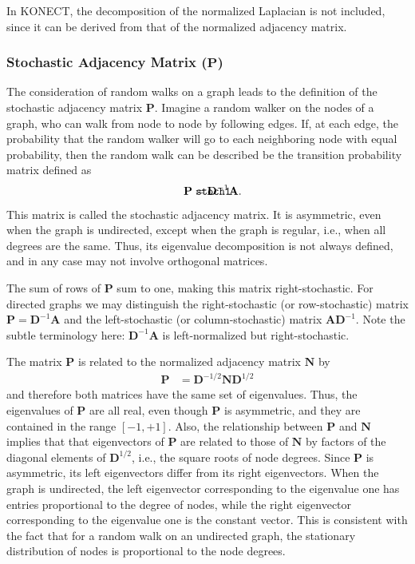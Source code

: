 \documentclass{article}
\def\mathnote#1{%
  \tag*{\rlap{\hspace\marginparsep\smash{\parbox[t]{\marginparwidth}{#1}}}}
}
\begin{document}
In KONECT, the decomposition of the normalized Laplacian is not
included, since it can be derived from that of the normalized adjacency
matrix. 

\subsubsection{Stochastic Adjacency Matrix ($\mathbf P$)}
The consideration of random walks on a graph leads to the definition of
the stochastic adjacency matrix $\mathbf P$.  Imagine a random walker on
the nodes of a graph, who can walk from node to node by following
edges.  If, at each edge, the probability that the random walker will go
to each neighboring node with equal probability, then the random walk
can be described be the transition probability matrix defined as
\begin{align*}
  \mathnote{\texttt{stoch1}}
  \mathbf P &= \mathbf D^{-1} \mathbf A.
\end{align*}
This matrix is called the stochastic adjacency matrix.  It is asymmetric,
even when the graph is undirected, except when the graph is regular,
i.e., when all degrees are the same.  
Thus, its eigenvalue decomposition
is not always defined, and in any case may not involve orthogonal
matrices. 

The sum of rows of $\mathbf P$ sum to one, making this matrix
right-stochastic. 
For directed graphs we may distinguish the right-stochastic (or
row-stochastic) matrix 
$\mathbf P = \mathbf D^{-1} \mathbf A$ and the left-stochastic (or column-stochastic)
matrix $\mathbf A \mathbf D^{-1}$.  Note the subtle terminology here:
$\mathbf D^{-1} \mathbf A$ is left-normalized but right-stochastic. 

The matrix $\mathbf P$ is related to the normalized adjacency matrix $\mathbf N$ by
\begin{align*}
  \mathbf P &= \mathbf D^{-1/2} \mathbf N \mathbf D^{1/2}
\end{align*}
and therefore both matrices have the same set of eigenvalues.
Thus, the eigenvalues of $\mathbf P$ are all real, even though
$\mathbf P$ is asymmetric, and they are contained in the range $[-1,+1]$. 
Also, the relationship between $\mathbf P$ and $\mathbf N$ implies that that
eigenvectors of $\mathbf P$ are related to those of 
$\mathbf N$ by factors of the diagonal elements of $\mathbf D^{1/2}$,
i.e., the square roots of node degrees. 
Since $\mathbf P$ is asymmetric, its left eigenvectors differ from its
right eigenvectors.  When the graph is undirected, the left eigenvector
corresponding to the eigenvalue one has entries proportional to the
degree of nodes, 
while the right eigenvector corresponding to the eigenvalue one 
is the constant vector.  This is consistent with the fact that for a
random walk on an undirected graph, the stationary distribution of nodes
is proportional to the node degrees. 
\end{document}
